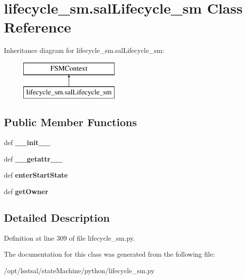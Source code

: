 \hypertarget{classlifecycle__sm_1_1sal_lifecycle__sm}{\section{lifecycle\-\_\-sm.\-sal\-Lifecycle\-\_\-sm Class Reference}
\label{classlifecycle__sm_1_1sal_lifecycle__sm}
}
Inheritance diagram for lifecycle\-\_\-sm.\-sal\-Lifecycle\-\_\-sm\-:\begin{figure}[H]
\begin{center}
\leavevmode
\includegraphics[height=2.000000cm]{classlifecycle__sm_1_1sal_lifecycle__sm}
\end{center}
\end{figure}
\subsection*{Public Member Functions}
\begin{DoxyCompactItemize}
\item 
\hypertarget{classlifecycle__sm_1_1sal_lifecycle__sm_a35dbbfc19645c76c2a4ac22e5bac7c54}{def {\bfseries \-\_\-\-\_\-init\-\_\-\-\_\-}}\label{classlifecycle__sm_1_1sal_lifecycle__sm_a35dbbfc19645c76c2a4ac22e5bac7c54}

\item 
\hypertarget{classlifecycle__sm_1_1sal_lifecycle__sm_af852f09b76ef01ebc8892ec8d1cf0f54}{def {\bfseries \-\_\-\-\_\-getattr\-\_\-\-\_\-}}\label{classlifecycle__sm_1_1sal_lifecycle__sm_af852f09b76ef01ebc8892ec8d1cf0f54}

\item 
\hypertarget{classlifecycle__sm_1_1sal_lifecycle__sm_a2463d653d91be811da18a0787bb18ca7}{def {\bfseries enter\-Start\-State}}\label{classlifecycle__sm_1_1sal_lifecycle__sm_a2463d653d91be811da18a0787bb18ca7}

\item 
\hypertarget{classlifecycle__sm_1_1sal_lifecycle__sm_a98aa3fafe90fada03cc9cb7b7638905d}{def {\bfseries get\-Owner}}\label{classlifecycle__sm_1_1sal_lifecycle__sm_a98aa3fafe90fada03cc9cb7b7638905d}

\end{DoxyCompactItemize}


\subsection{Detailed Description}


Definition at line 309 of file lifecycle\-\_\-sm.\-py.



The documentation for this class was generated from the following file\-:\begin{DoxyCompactItemize}
\item 
/opt/lsstsal/state\-Machine/python/lifecycle\-\_\-sm.\-py\end{DoxyCompactItemize}
